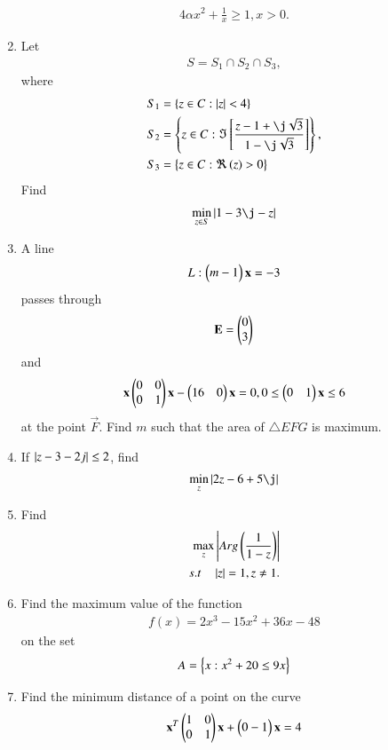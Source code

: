 \documentclass[journal,12pt,twocolumn]{IEEEtran}
\begin{document}
\begin{enumerate}[label=\arabic*.]
\begin{align}
4\alpha x^2 + \frac{1}{x} \ge 1, x > 0.
\end{align}
\item Let 
\begin{align}
S = S_1\cap S_2\cap S_3,
\end{align}
%
where
\begin{align}
S_1 &= \cbrak{z\in C: \abs{z}< 4}
\\
S_2 &= \cbrak{z\in C: \Im\sbrak{\frac{z-1+\j\sqrt{3}}{1-\j\sqrt{3}}}},
\\
S_3 &= \cbrak{z\in C: \Re\brak{z} > 0}
\end{align}
Find
\begin{align}
\min_{z\in S}\abs{1-3\j-z}
\end{align}
\item A line 
\begin{align}
L: \begin{pmatrix}m -1\end{pmatrix}\mathbf{x} = -3
\end{align}
passes through
\begin{align}
\mathbf{E} = \begin{pmatrix}0\\3\end{pmatrix}
\end{align}
and 
\begin{align}
\mathbf{x}\begin{pmatrix}0 & 0 \\ 0 & 1\end{pmatrix}\mathbf{x} - \begin{pmatrix}16 & 0\end{pmatrix}\mathbf{x} = 0, 0 \le \begin{pmatrix}0 & 1\end{pmatrix}\mathbf{x} \le 6
\end{align}
%
at the point $\vec{F}$.  Find $m$ such that the area of $\triangle EFG$ is maximum.
\item If $\left\vert z-3-2j\right\vert \le 2$, find
\begin{align}
\min_{z}\abs{2z-6+5\j}
\end{align}
\item Find 
\begin{align}
\max_{z}\left\vert Arg\left(\frac{1}{1-z}\right)\right\vert
\\
s.t\quad \left\vert z\right\vert = 1, z \ne 1.
\end{align}
\item Find the maximum value of the function 
\begin{align}
f(x) = 2x^3-15x^2+36x-48
\end{align}
on the set 
\begin{align}
A = \left\{x : x^2+20 \le 9x\right\}
\end{align}
\item Find the minimum distance of a point on the curve 
\begin{align}
\vec{x}^T\myvec{1 & 0 \\ 0 & 1}\vec{x} + \myvec{0 -1}\vec{x}=4

\end{align}
\end{enumerate}
\end{document}
